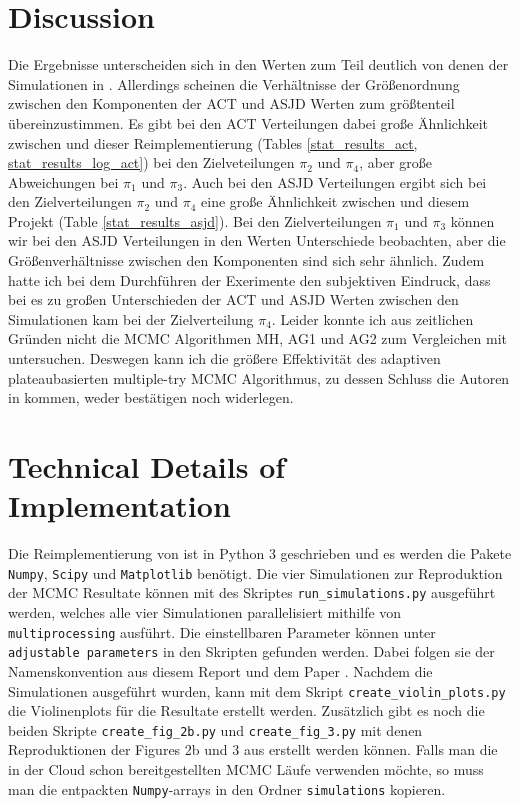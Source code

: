 \documentclass{scrartcl}
\begin{document}
    \section{Discussion}
    Die Ergebnisse unterscheiden sich in den Werten zum Teil deutlich von denen der Simulationen in \cite{lau2019}.
    Allerdings scheinen die Verhältnisse der Größenordnung zwischen den Komponenten der ACT und ASJD Werten zum größtenteil übereinzustimmen.
    Es gibt bei den ACT Verteilungen dabei große Ähnlichkeit zwischen \cite{lau2019} und dieser Reimplementierung (Tables \ref{stat_results_act, stat_results_log_act}) bei den Zielveteilungen
    $\pi_2$ und $\pi_4$, aber große Abweichungen bei $\pi_1$ und $\pi_3$. Auch bei den ASJD Verteilungen ergibt sich bei den Zielverteilungen $\pi_2$ und $\pi_4$ eine große Ähnlichkeit
    zwischen \cite{lau2019} und diesem Projekt (Table \ref{stat_results_asjd}). Bei den Zielverteilungen $\pi_1$ und $\pi_3$ können wir bei den ASJD Verteilungen
    in den Werten Unterschiede beobachten, aber die Größenverhältnisse zwischen den Komponenten sind sich sehr ähnlich.
    Zudem hatte ich bei dem Durchführen der Exerimente den subjektiven Eindruck, dass bei es zu großen Unterschieden der ACT und ASJD Werten zwischen den Simulationen kam bei der Zielverteilung $\pi_4$.
    Leider konnte ich aus zeitlichen Gründen nicht die MCMC Algorithmen MH, AG1 und AG2 zum Vergleichen \cite{lau2019} mit untersuchen. Deswegen kann
    ich die größere Effektivität des adaptiven plateaubasierten multiple-try MCMC Algorithmus, zu dessen Schluss die Autoren in \cite{lau2019} kommen,
    weder bestätigen noch widerlegen.


    \section{Technical Details of Implementation}
    Die Reimplementierung von \cite{lau2019} ist in Python 3 geschrieben und es werden die Pakete \texttt{Numpy}, \texttt{Scipy}
    und \texttt{Matplotlib} benötigt. Die vier Simulationen zur Reproduktion der MCMC Resultate können mit des Skriptes
    \texttt{run\_simulations.py} ausgeführt werden, welches alle vier Simulationen parallelisiert mithilfe von \texttt{multiprocessing} ausführt.
    Die einstellbaren Parameter können unter \texttt{adjustable parameters} in den Skripten gefunden werden. Dabei folgen sie der Namenskonvention aus diesem Report
    und dem Paper \cite{lau2019}. Nachdem die Simulationen ausgeführt wurden, kann mit dem Skript \texttt{create\_violin\_plots.py}
    die Violinenplots für die Resultate erstellt werden. Zusätzlich gibt es noch die beiden Skripte \texttt{create\_fig\_2b.py}
    und \texttt{create\_fig\_3.py} mit denen Reproduktionen der Figures 2b und 3 aus \cite{lau2019} erstellt werden können.
    Falls man die in der Cloud schon bereitgestellten MCMC Läufe verwenden möchte, so muss man die entpackten \texttt{Numpy}-arrays in den Ordner
    \texttt{simulations} kopieren.

    
    
\end{document}
